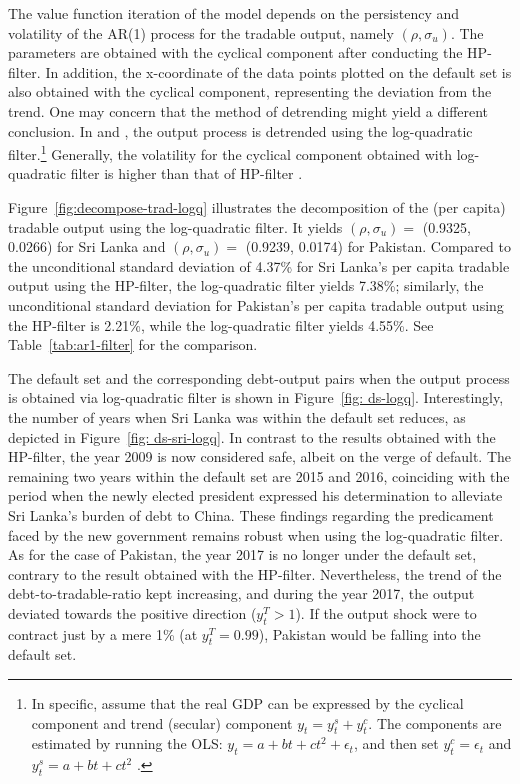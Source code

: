 The value function iteration of the model depends on the persistency and volatility of the AR(1) process for the tradable output, namely $(\rho, \sigma_u)$. The parameters are obtained with the cyclical component after conducting the HP-filter. In addition, the x-coordinate of the data points plotted on the default set is also obtained with the cyclical component, representing the deviation from the trend. One may concern that the method of detrending might yield a different conclusion. In \citet{Na-18} and \cite{Hinrichsen_2020-chapter4}, the output process is detrended using the log-quadratic filter.\footnote{
    In specific, assume that the real GDP can be expressed by the cyclical component and trend (secular) component $y_t = y^s_t + y^c_t$. The components are estimated by running the OLS: $y_t = a + bt + ct^2 + \epsilon_t$, and then set $y^c_t = \epsilon_t$ and $y^s_t = a + bt + ct^2$ \citep{Uribe-Schmitt-Grohe-textbook}.
}
Generally, the volatility for the cyclical component obtained with log-quadratic filter is higher than that of HP-filter \citep{Uribe-Schmitt-Grohe-textbook}.

Figure~\ref{fig:decompose-trad-logq} illustrates the decomposition of the (per capita) tradable output using the log-quadratic filter. It yields $(\rho, \sigma_u)=$ (0.9325, 0.0266) for Sri Lanka and $(\rho, \sigma_u)=$ (0.9239, 0.0174) for Pakistan. Compared to the unconditional standard deviation of 4.37\% for Sri Lanka's per capita tradable output using the HP-filter, the log-quadratic filter yields 7.38\%; similarly, the unconditional standard deviation for Pakistan's per capita tradable output using the HP-filter is 2.21\%, while the log-quadratic filter yields 4.55\%.
See Table~\ref{tab:ar1-filter} for the comparison.

The default set and the corresponding debt-output pairs when the output process is obtained via log-quadratic filter is shown in Figure~\ref{fig: ds-logq}. Interestingly, the number of years when Sri Lanka was within the default set reduces, as depicted in Figure~\ref{fig: ds-sri-logq}.
In contrast to the results obtained with the HP-filter, the year 2009 is now considered safe, albeit on the verge of default. The remaining two years within the default set are 2015 and 2016, coinciding with the period when the newly elected president expressed his determination to alleviate Sri Lanka's burden of debt to China. These findings regarding the predicament faced by the new government remains robust when using the log-quadratic filter.
As for the case of Pakistan, the year 2017 is no longer under the default set, contrary to the result obtained with the HP-filter. Nevertheless, the trend of the debt-to-tradable-ratio kept increasing, and during the year 2017, the output deviated towards the positive direction ($y^T_t > 1$). If the output shock were to contract just by a mere 1\% (at $y^T_t = 0.99$), Pakistan would be falling into the default set.